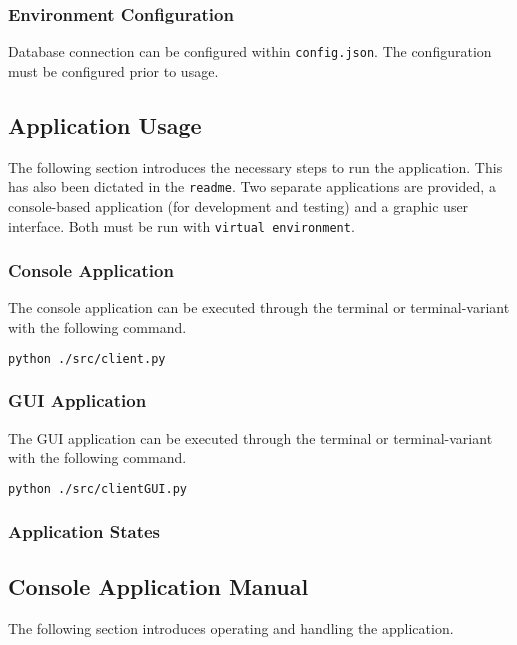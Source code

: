 \documentclass[11pt]{article}
\begin{document}
            \subsubsection{Environment Configuration}
                Database connection can be configured within \texttt{config.json}. The configuration must be configured prior to usage.

        \subsection{Application Usage}
            The following section introduces the necessary steps to run the application. This has also been dictated in the \texttt{readme}.
            \newline
            Two separate applications are provided, a console-based application (for development and testing) and a graphic user interface. Both must be run with \texttt{virtual environment}.
            \subsubsection{Console Application}
            The console application can be executed through the terminal or terminal-variant with the following command.
                \begin{lstlisting}[language=sh, caption=client console application usage]
                python ./src/client.py
                \end{lstlisting}
            \subsubsection{GUI Application}
            The GUI application can be executed through the terminal or terminal-variant with the following command.
                \begin{lstlisting}[language=sh,caption=client GUI application usage ]
                python ./src/clientGUI.py
                \end{lstlisting}
            \subsubsection{Application States}

        \subsection{Console Application Manual}
            The following section introduces operating and handling the application.
\end{document}

